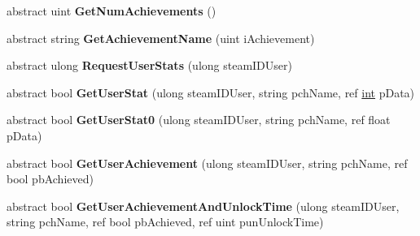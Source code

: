 \begin{DoxyCompactItemize}
\item 
\hypertarget{classValve_1_1Steamworks_1_1ISteamUserStats_a3023cf638c7e1b8b92a6b3431b30ff30}{}abstract uint {\bfseries Get\+Num\+Achievements} ()\label{classValve_1_1Steamworks_1_1ISteamUserStats_a3023cf638c7e1b8b92a6b3431b30ff30}

\item 
\hypertarget{classValve_1_1Steamworks_1_1ISteamUserStats_a71acbf56be4aa907324de349df361006}{}abstract string {\bfseries Get\+Achievement\+Name} (uint i\+Achievement)\label{classValve_1_1Steamworks_1_1ISteamUserStats_a71acbf56be4aa907324de349df361006}

\item 
\hypertarget{classValve_1_1Steamworks_1_1ISteamUserStats_af4446544a7bd757c67755f43e7029398}{}abstract ulong {\bfseries Request\+User\+Stats} (ulong steam\+I\+D\+User)\label{classValve_1_1Steamworks_1_1ISteamUserStats_af4446544a7bd757c67755f43e7029398}

\item 
\hypertarget{classValve_1_1Steamworks_1_1ISteamUserStats_ad6a2936ac451aa38c4400cb437b49187}{}abstract bool {\bfseries Get\+User\+Stat} (ulong steam\+I\+D\+User, string pch\+Name, ref \hyperlink{SDL__thread_8h_a6a64f9be4433e4de6e2f2f548cf3c08e}{int} p\+Data)\label{classValve_1_1Steamworks_1_1ISteamUserStats_ad6a2936ac451aa38c4400cb437b49187}

\item 
\hypertarget{classValve_1_1Steamworks_1_1ISteamUserStats_a2a0e02821ddad18d9582c35b128cc5fa}{}abstract bool {\bfseries Get\+User\+Stat0} (ulong steam\+I\+D\+User, string pch\+Name, ref float p\+Data)\label{classValve_1_1Steamworks_1_1ISteamUserStats_a2a0e02821ddad18d9582c35b128cc5fa}

\item 
\hypertarget{classValve_1_1Steamworks_1_1ISteamUserStats_a9f0b187dfc7c2addbd270bec3fcdcd96}{}abstract bool {\bfseries Get\+User\+Achievement} (ulong steam\+I\+D\+User, string pch\+Name, ref bool pb\+Achieved)\label{classValve_1_1Steamworks_1_1ISteamUserStats_a9f0b187dfc7c2addbd270bec3fcdcd96}

\item 
\hypertarget{classValve_1_1Steamworks_1_1ISteamUserStats_a4b8e0a4a7a6b9eaf5ce8177dbe3528a8}{}abstract bool {\bfseries Get\+User\+Achievement\+And\+Unlock\+Time} (ulong steam\+I\+D\+User, string pch\+Name, ref bool pb\+Achieved, ref uint pun\+Unlock\+Time)\label{classValve_1_1Steamworks_1_1ISteamUserStats_a4b8e0a4a7a6b9eaf5ce8177dbe3528a8}


\end{DoxyCompactItemize}
